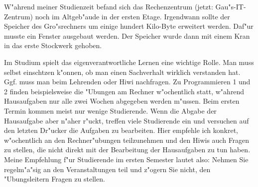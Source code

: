 
W"ahrend meiner Studienzeit befand sich das Rechenzentrum (jetzt: Gau"s-IT-Zentrum) noch im Altgeb"aude in der ersten Etage.
Irgendwann sollte der Speicher des Gro"srechners um einige hundert Kilo-Byte erweitert werden.
Daf"ur musste ein Fenster ausgebaut werden.
Der Speicher wurde dann mit einem Kran in das erste Stockwerk gehoben.


Im Studium spielt das eigenverantwortliche Lernen eine wichtige Rolle.
Man muss selbst einschtzen k"onnen, ob man einen Sachverhalt wirklich verstanden hat.
Ggf. muss man beim Lehrenden oder Hiwi nachfragen.
Zu Programmieren 1 und 2 finden beispielsweise die "Ubungen am Rechner w"ochentlich statt, w"ahrend Hausaufgaben nur alle zwei Wochen abgegeben werden m"ussen.
Beim ersten Termin kommen meist nur wenige Studierende.
Wenn die Abgabe der Hausaufgabe aber n"aher r"uckt, treffen viele Studierende ein und versuchen auf den letzten Dr"ucker die Aufgaben zu bearbeiten.
Hier empfehle ich konkret, w"ochentlich an den Rechner"ubungen teilzunehmen und
den Hiwis auch Fragen zu stellen, die nicht direkt mit der Bearbeitung der Hausaufgaben zu tun haben.
Meine Empfehlung f"ur Studierende im ersten Semester lautet also: 
Nehmen Sie regelm"a"sig an den Veranstaltungen teil und z"ogern Sie nicht, den "Ubungsleitern Fragen zu stellen.
